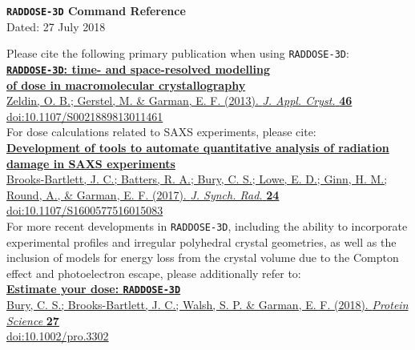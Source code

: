 \documentclass[a4paper]{article}
\newcommand{\RD}{\texttt{RADDOSE-3D}\xspace}
\begin{document}
\begin{center}
\noindent \textsf{\huge\textbf{\RD Command Reference}}\\[0.3em]
Dated: 27 July 2018\\[3.5em]
\end{center}

\noindent
Please cite the following primary publication when using \RD:\\[0.4em]
\href{http://dx.doi.org/10.1107/S0021889813011461}{\large\textbf{\RD: time- and space-resolved modelling\\[0.0em] of dose in macromolecular crystallography}}\\[0.1em]
\href{http://dx.doi.org/10.1107/S0021889813011461}{Zeldin, O. B.; Gerstel, M. \& Garman, E. F. (2013). \textit{J. Appl. Cryst.} \textbf{46} %
}\\[0.1em]
\href{http://dx.doi.org/10.1107/S0021889813011461}{doi:10.1107/S0021889813011461}
\\[1.5em]
\noindent
For dose calculations related to SAXS experiments, please cite:\\[0.4em]
\href{https://doi.org/10.1107/S1600577516015083}{\large\textbf{Development of tools to automate quantitative analysis of radiation damage in SAXS experiments}}\\[0.1em]
\href{https://doi.org/10.1107/S1600577516015083}{Brooks-Bartlett, J. C.; Batters, R. A.; Bury, C. S.; Lowe, E. D.; Ginn, H. M.; Round, A., \& Garman, E. F. (2017). \textit{J. Synch. Rad.} \textbf{24} %
}\\[0.1em]
\href{https://doi.org/10.1107/S1600577516015083}{doi:10.1107/S1600577516015083}
\\[1.5em]
\noindent
For more recent developments in \RD, including the ability to incorporate experimental profiles and irregular polyhedral crystal geometries, as well as the inclusion of  models for energy loss from the crystal volume due to the Compton effect and photoelectron escape, please additionally refer to:\\[0.4em]
\href{https://doi.org/10.1002/pro.3302}{\large\textbf{Estimate your dose: \RD}}\\[0.1em]
\href{https://doi.org/10.1002/pro.3302}{Bury, C. S.; Brooks-Bartlett, J. C.; Walsh, S. P. \& Garman, E. F. (2018). \textit{Protein Science} \textbf{27} %
}\\[0.1em]
\href{https://doi.org/10.1002/pro.3302}{doi:10.1002/pro.3302}
\\[1.5em]
\end{document}
